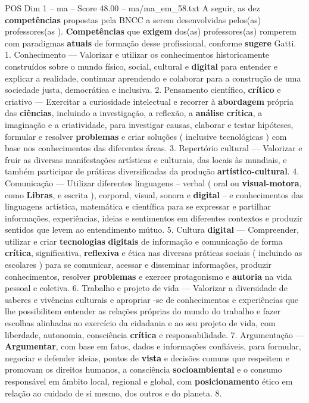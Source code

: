 \begin{textsample}{POS Dim 1 – ma – Score 48.00 – ma/ma\_em\_58.txt}
A seguir, as dez \textbf{competências} propostas pela BNCC a serem desenvolvidas pelos(as) professores(as ). \textbf{Competências} que \textbf{exigem} dos(as) professores(as) romperem com paradigmas \textbf{atuais} de formação desse profissional, conforme \textbf{sugere} Gatti. 1.
Conhecimento — Valorizar e utilizar os conhecimentos historicamente construídos sobre o mundo físico, social, cultural e \textbf{digital} para entender e explicar a realidade, continuar aprendendo e colaborar para a construção de uma sociedade justa, democrática e inclusiva. 2.
Pensamento científico, \textbf{crítico} e criativo — Exercitar a curiosidade intelectual e recorrer à \textbf{abordagem} própria das \textbf{ciências}, incluindo a investigação, a reflexão, a \textbf{análise} \textbf{crítica}, a imaginação e a criatividade, para investigar causas, elaborar e testar hipóteses, formular e resolver \textbf{problemas} e criar soluções ( inclusive tecnológicas ) com base nos conhecimentos das diferentes áreas. 3.
Repertório cultural — Valorizar e fruir as diversas manifestações artísticas e culturais, das locais às mundiais, e também participar de práticas diversificadas da produção \textbf{artístico-cultural}. 4.
Comunicação — Utilizar diferentes linguagens – verbal ( oral ou \textbf{visual-motora}, como \textbf{Libras}, e escrita ), corporal, visual, sonora e \textbf{digital} – e conhecimentos das linguagens artística, matemática e científica para se expressar e partilhar informações, experiências, ideias e sentimentos em diferentes contextos e produzir sentidos que levem ao entendimento mútuo. 5.
Cultura \textbf{digital} — Compreender, utilizar e criar \textbf{tecnologias} \textbf{digitais} de informação e comunicação de forma \textbf{crítica}, significativa, \textbf{reflexiva} e ética nas diversas práticas sociais ( incluindo as escolares ) para se comunicar, acessar e disseminar informações, produzir conhecimentos, resolver \textbf{problemas} e exercer protagonismo e \textbf{autoria} na vida pessoal e coletiva. 6.
Trabalho e projeto de vida — Valorizar a diversidade de saberes e vivências culturais e apropriar -se de conhecimentos e experiências que lhe possibilitem entender as relações próprias do mundo do trabalho e fazer escolhas alinhadas ao exercício da cidadania e ao seu projeto de vida, com liberdade, autonomia, consciência \textbf{crítica} e responsabilidade. 7.
Argumentação — \textbf{Argumentar}, com base em fatos, dados e informações confiáveis, para formular, negociar e defender ideias, pontos de \textbf{vista} e decisões comuns que respeitem e promovam os direitos humanos, a consciência \textbf{socioambiental} e o consumo responsável em âmbito local, regional e global, com \textbf{posicionamento} ético em relação ao cuidado de si mesmo, dos outros e do planeta. 8.

\end{textsample}
